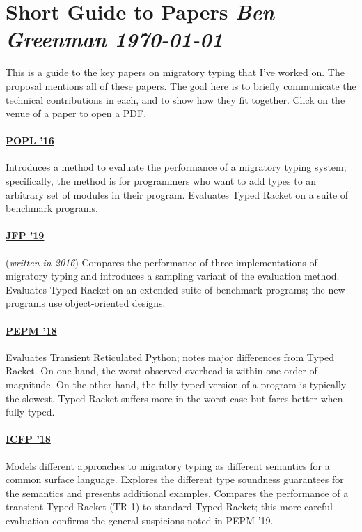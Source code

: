 \documentclass[10pt]{article}
\begin{document}

\nolinenumbers

\section*{Short Guide to Papers \hfill{\normalfont\small\it Ben Greenman \quad \today}}

This is a guide to the key papers on migratory typing that I've worked on.
The proposal mentions all of these papers.
The goal here is to briefly communicate the technical contributions in each,
 and to show how they fit together.
Click on the venue of a paper to open a PDF.

\bigskip
\hfill{}\decoone\hfill{}

\paragraph{\href{https://www2.ccs.neu.edu/racket/pubs/popl16-tfgnvf.pdf}{POPL '16}}
Introduces a method to evaluate the performance of a migratory typing system;
 specifically, the method is for programmers who want to add types
 to an arbitrary set of modules in their program.
Evaluates Typed Racket on a suite of benchmark programs.


\paragraph{\href{https://www2.ccs.neu.edu/racket/pubs/gtnffvf-jfp19.pdf}{JFP '19}}
(\emph{written in 2016}\/) \quad
Compares the performance of three implementations of migratory typing and
 introduces a sampling variant of the evaluation method.
Evaluates Typed Racket on an extended suite of benchmark programs;
 the new programs use object-oriented designs.


\paragraph{\href{https://www2.ccs.neu.edu/racket/pubs/pepm18-gm.pdf}{PEPM '18}}
Evaluates Transient Reticulated Python;
 notes major differences from Typed Racket.
On one hand, the worst observed overhead is within one order of magnitude.
On the other hand, the fully-typed version of a program is typically the slowest.
Typed Racket suffers more in the worst case but fares better when fully-typed.


\paragraph{\href{https://www2.ccs.neu.edu/racket/pubs/icfp18-gf.pdf}{ICFP '18}}
Models different approaches to migratory typing as different semantics for a
 common surface language.
Explores the different type soundness guarantees for the semantics and
 presents additional examples.
Compares the performance of a transient Typed Racket (TR-1) to standard
 Typed Racket; this more careful evaluation confirms the general suspicions
 noted in PEPM '19.
\end{document}
